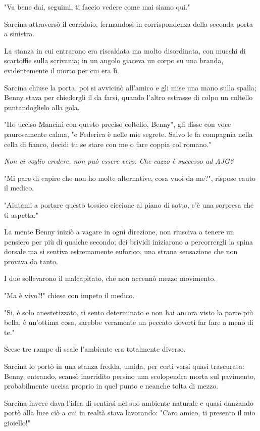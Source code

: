 "Va bene dai, seguimi, ti faccio vedere come mai siamo qui."

Sarcina attraversò il corridoio, fermandosi in corrispondenza della seconda porta a sinistra.

La stanza in cui entrarono era riscaldata ma molto disordinata, con mucchi di scartoffie sulla scrivania; in un angolo giaceva un corpo su una branda, evidentemente il morto per cui era lì.

Sarcina chiuse la porta, poi si avvicinò all'amico e gli mise una mano sulla spalla; Benny stava per chiedergli il da farsi, quando l'altro estrasse di colpo un coltello puntandoglielo alla gola.

"Ho ucciso Mancini con questo preciso coltello, Benny", gli disse con voce paurosamente calma, "e Federica è nelle mie segrete. Salvo le fa compagnia nella cella di fianco, decidi tu se stare con me o fare coppia col romano."

\textit{Non ci voglio credere, non può essere vero. Che cazzo è successo ad AJG?}

"Mi pare di capire che non ho molte alternative, cosa vuoi da me?", rispose cauto il medico.

"Aiutami a portare questo tossico ciccione al piano di sotto, c'è una sorpresa che ti aspetta."

La mente Benny iniziò a vagare in ogni direzione, non riusciva a tenere un pensiero per più di qualche secondo; dei brividi iniziarono a percorrergli la spina dorsale ma si sentiva estremamente euforico, una strana sensazione che non provava da tanto.

I due sollevarono il malcapitato, che non accennò mezzo movimento.

"Ma è vivo?!" chiese con impeto il medico.

"Si, è solo anestetizzato, ti sento determinato e non hai ancora visto la parte più bella, è un'ottima cosa, sarebbe veramente un peccato doverti far fare a meno di te."

Scese tre rampe di scale l'ambiente era totalmente diverso.

Sarcina lo portò in una stanza fredda, umida, per certi versi quasi trascurata: Benny, entrando, scansò inorridito persino una scolopendra morta sul pavimento, probabilmente uccisa proprio in quel punto e neanche tolta di mezzo.

Sarcina invece dava l'idea di sentirsi nel suo ambiente naturale e quasi danzando portò alla luce ciò a cui in realtà stava lavorando: "Caro amico, ti presento il mio gioiello!"

